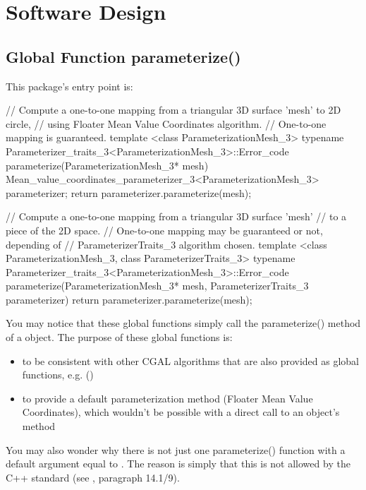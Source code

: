 \section{Software Design}

\subsection{Global Function parameterize()}

This package's entry point is:

\begin{ccExampleCode}

// Compute a one-to-one mapping from a triangular 3D surface 'mesh' to 2D circle,
// using Floater Mean Value Coordinates algorithm.
// One-to-one mapping is guaranteed.
template <class ParameterizationMesh_3>
typename Parameterizer_traits_3<ParameterizationMesh_3>::Error_code
parameterize(ParameterizationMesh_3* mesh)
{
    Mean_value_coordinates_parameterizer_3<ParameterizationMesh_3> parameterizer;
    return parameterizer.parameterize(mesh);
}

// Compute a one-to-one mapping from a triangular 3D surface 'mesh'
// to a piece of the 2D space.
// One-to-one mapping may be guaranteed or not, depending of
// ParameterizerTraits_3 algorithm chosen.
template <class ParameterizationMesh_3, class ParameterizerTraits_3>
typename Parameterizer_traits_3<ParameterizationMesh_3>::Error_code
parameterize(ParameterizationMesh_3* mesh,
             ParameterizerTraits_3 parameterizer)
{
    return parameterizer.parameterize(mesh);
}

\end{ccExampleCode}

You may notice that these global functions simply call the
parameterize() method of a  object.
The purpose of these global functions is:
\begin{itemize}
\item to be consistent with other CGAL algorithms that are also provided as
      global functions, e.g. ()
\item to provide a default parameterization method (Floater Mean Value Coordinates),
      which wouldn't be possible with a direct call to an object's method
\end{itemize}

You may also wonder why there is not just one parameterize() function with a
default  argument equal to
.
The reason is simply that this is not allowed by the C++ standard (see
\cite{cgal:ansi-is14882-98}, paragraph 14.1/9).


